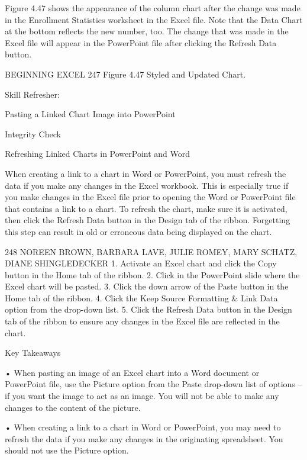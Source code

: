 Figure 4.47 shows the appearance of the column chart after the change was made in the Enrollment
Statistics worksheet in the Excel file. Note that the Data Chart at the bottom reflects the new number,
too. The change that was made in the Excel file will appear in the PowerPoint file after clicking the
Refresh Data button.




BEGINNING EXCEL 247
Figure 4.47 Styled and Updated Chart.




Skill Refresher:


Pasting a Linked Chart Image into PowerPoint




Integrity Check

Refreshing Linked Charts in PowerPoint and Word

When creating a link to a chart in Word or PowerPoint, you must refresh the data if you make any changes in
the Excel workbook. This is especially true if you make changes in the Excel file prior to opening the Word or
PowerPoint file that contains a link to a chart. To refresh the chart, make sure it is activated, then click the Refresh
Data button in the Design tab of the ribbon. Forgetting this step can result in old or erroneous data being displayed
on the chart.




248 NOREEN BROWN, BARBARA LAVE, JULIE ROMEY, MARY SCHATZ, DIANE SHINGLEDECKER
1. Activate an Excel chart and click the Copy button in the Home tab of the ribbon.
2. Click in the PowerPoint slide where the Excel chart will be pasted.
3. Click the down arrow of the Paste button in the Home tab of the ribbon.
4. Click the Keep Source Formatting & Link Data option from the drop-down list.
5. Click the Refresh Data button in the Design tab of the ribbon to ensure any changes in the Excel file are
reflected in the chart.




Key Takeaways


• When pasting an image of an Excel chart into a Word document or PowerPoint file, use the Picture option
from the Paste drop-down list of options – if you want the image to act as an image. You will not be able to
make any changes to the content of the picture.

• When creating a link to a chart in Word or PowerPoint, you may need to refresh the data if you make any
changes in the originating spreadsheet. You should not use the Picture option.



